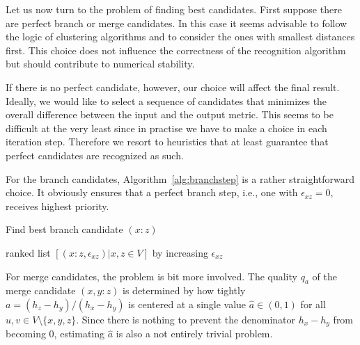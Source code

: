 \documentclass[amsmath]{lni}
\begin{document}
Let us now turn to the problem of finding best candidates. First suppose
there are perfect branch or merge candidates. In this case it seems
advisable to follow the logic of clustering algorithms and to consider the 
ones with smallest distances first. This choice does not influence the
correctness of the recognition algorithm but should contribute to numerical
stability.

If there is no perfect candidate, however, our choice will affect the final
result. Ideally, we would like to select a sequence of candidates that
minimizes the overall difference between the input and the output metric.
This seems to be difficult at the very least since in practise we have to
make a choice in each iteration step. Therefore we resort to heuristics
that at least guarantee that perfect candidates are recognized as such.

For the branch candidates, Algorithm~\ref{alg:branchstep} is a rather
straightforward choice. It obviously ensures that a perfect branch step,
i.e., one with $\epsilon_{xz}=0$, receives highest priority.

\begin{algorithm}[H]
\caption{Find best branch candidate $(x:z)$ } 
\label{alg:branchstep}
\SetAlgoLined
{}
\Return ranked list $[(x:z,\epsilon_{xz})| x,z\in V]$ by increasing 
$\epsilon_{xz}$\;
\end{algorithm} 

For merge candidates, the problem is bit more involved. The quality $q_a$
of the merge candidate $(x,y:z)$ is determined by how tightly
$a=(h_z-h_y)/(h_x-h_y)$ is centered at a single value $\hat a\in (0,1)$ for
all $u,v\in V\setminus\{x,y,z\}$. Since there is nothing to prevent the
denominator $h_x-h_y$ from becoming $0$, estimating $\hat a$ is also a not
entirely trivial problem.
\end{document}

